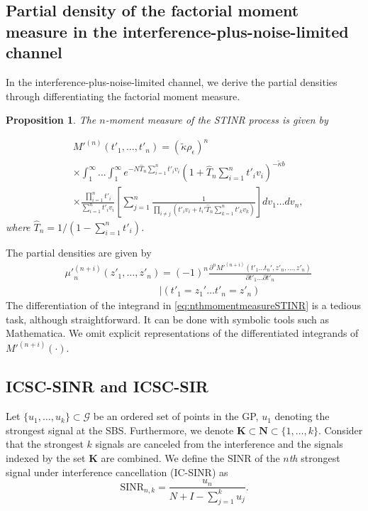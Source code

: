 \documentclass[lettersize,journal]{IEEEtran}
\newtheorem{prop}[theorem]{Proposition}
\begin{document}
\subsection{Partial density of the factorial moment measure in the interference-plus-noise-limited channel}


In the interference-plus-noise-limited channel, we derive the partial densities through differentiating the factorial moment measure.

\begin{prop}
  The $n$-moment measure of the STINR process is given by

  \begin{align}
    \label{eq:nthmomentmeasureSTINR}
      &M'^{(n)}(t'_1,\dots,t'_n) =\left(\tilde{\kappa} \rho_{\epsilon}\right)^n \nonumber\\
      &\times \int_1^{\infty}\dots\int_1^{\infty} e^{-N\hat{T}_n\sum\limits_{i=1}^nt'_iv_i} \left(1+\hat{T}_n\sum\limits_{i=1}^nt'_iv_i\right)^{-\tilde{\kappa}b} \nonumber\\
      &\times \frac{\prod\limits_{i=1}^nt'_i}{\sum\limits_{i=1}^nt'_iv_i}  \left[\sum\limits_{j=1}^n\frac{1}{\prod\limits_{i\neq j}\left(t'_i v_i+ t_i'\hat{T}_n\sum\limits_{k=1}^nt'_kv_k \right)} \right] dv_1 \dots dv_n,
    \end{align}
    where $\hat{T}_n= 1/(1-\sum_{i=1}^nt'_i)$.


\end{prop}
 
The partial densities are given by
    \begin{align}
      \label{eq:differatemomentmeasure}
     &{\mu'}_n^{(n+i)}(z'_1,\dots,z'_n)= (-1)^n \frac{\partial^n M'^{(n+i)}(t'_1\dots t_n', z'_n, \dots, z'_n)}{\partial t'_1 \dots \partial t'_n} \nonumber\\
      &\hspace{4cm}|(t'_1=z_1'\dots t'_n=z'_n)
    \end{align}
The differentiation of the integrand in \eqref{eq:nthmomentmeasureSTINR} is a tedious task, although straightforward. It can be done with symbolic tools such as Mathematica. We omit explicit representations of the differentiated integrands of $M'^{(n+i)}(\cdot)$.



\subsection{ICSC-SINR and ICSC-SIR}


Let $\{u_1,\dots,u_k \}\subset \mathcal{G}$ be an ordered set of points in the GP, $u_1$ denoting the strongest signal at the SBS. Furthermore, we denote $\mathbf{K} \subset \mathbf{N} \subset \{1,\dots, k\}$. Consider that the strongest $k$ signals are canceled from the interference and the signals indexed by the set $\mathbf{K}$ are combined. We define the SINR of the $n$\textit{th} strongest signal under interference cancellation (IC-SINR) as
\begin{equation}
  \text{SINR}_{n,k} =\frac{u_n}{N+I-\sum_{j =1 }^k u_j}.
\end{equation}
\end{document}
